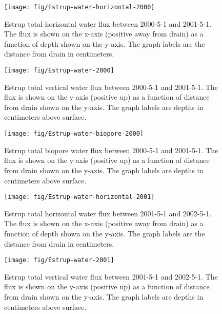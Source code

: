 \begin{figure}[htbp]
  \centering
  \texttt{[image: fig/Estrup-water-horizontal-2000]}
  
  \caption{Estrup total horizontal water flux between 2000-5-1 and
    2001-5-1.  The flux is shown on the x-axis (positive away from
    drain) as a function of depth shown on the y-axis.  The graph
    labels are the distance from drain in centimeters.}
  \label{fig:Estrup-water-horizontal-2000}
\end{figure}\FloatBarrier

\begin{figure}[htbp]
  \centering
  \texttt{[image: fig/Estrup-water-2000]}
  
  \caption{Estrup total vertical water flux between 2000-5-1 and
    2001-5-1.  The flux is shown on the y-axis (positive up) as a
    function of distance from drain shown on the y-axis.  The graph
    labels are depths in centimeters above surface.}
  \label{fig:Estrup-water-2000}
\end{figure}\FloatBarrier

\begin{figure}[htbp]
  \centering
  \texttt{[image: fig/Estrup-water-biopore-2000]}
  
  \caption{Estrup total biopore water flux between 2000-5-1 and
    2001-5-1.  The flux is shown on the y-axis (positive up) as a
    function of distance from drain shown on the y-axis.  The graph
    labels are depths in centimeters above surface.}
  \label{fig:Estrup-water-biopore-2000}
\end{figure}\FloatBarrier

\begin{figure}[htbp]
  \centering
  \texttt{[image: fig/Estrup-water-horizontal-2001]}
  
  \caption{Estrup total horizontal water flux between 2001-5-1 and
    2002-5-1.  The flux is shown on the x-axis (positive away from
    drain) as a function of depth shown on the y-axis.  The graph
    labels are the distance from drain in centimeters.}
  \label{fig:Estrup-water-2001-horizontal}
\end{figure}\FloatBarrier

\begin{figure}[htbp]
  \centering
  \texttt{[image: fig/Estrup-water-2001]}
  
  \caption{Estrup total vertical water flux between 2001-5-1 and
    2002-5-1.  The flux is shown on the y-axis (positive up) as a
    function of distance from drain shown on the y-axis.  The graph
    labels are depths in centimeters above surface.}
  \label{fig:Estrup-water-2001}
\end{figure}\FloatBarrier

